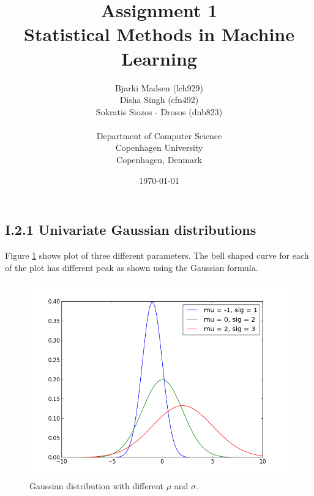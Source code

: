 \documentclass[12pt]{article}
\newcommand{\assignmentname}{Assignment 1}
\newcommand{\coursename}{Statistical Methods in Machine Learning}
\newcommand{\studentnameOne}{Bjarki Madsen (lch929)}
\newcommand{\studentnameTwo}{Disha Singh (cfn492)}
\newcommand{\studentnameThree}{Sokratis Siozos - Drosos (dnb823)}
\newcommand{\department}{Department of Computer Science}
\newcommand{\institution}{Copenhagen University}
\newcommand{\location}{Copenhagen, Denmark}
\begin{document}
\renewcommand\refname{References}

\title{\assignmentname \\ {\Large {\textsc \coursename}}}
\author{
        \studentnameOne \\
        \studentnameTwo \\
        \studentnameThree \\ \\
                \department \\
        \institution \\
        \location
}
\date{\today}

\maketitle
\thispagestyle{empty}

\pagebreak

\subsection*{I.2.1 Univariate Gaussian distributions}

  Figure \ref{fig:gaussian_distribution} shows plot of three different parameters. The bell shaped curve for  each of the plot has different peak as shown using the Gaussian formula. 

  \begin{figure}[h]
    \centering
        \includegraphics[width=1.0\textwidth]{figures/figure_I_2_1}
    \caption{Gaussian distribution with different $\mu$ and $\sigma$.}
    \label{fig:gaussian_distribution}
  \end{figure}
\end{document}
